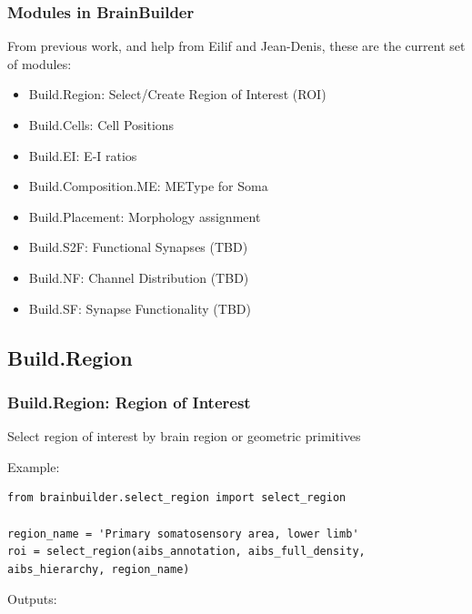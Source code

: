 \documentclass{beamer}
\begin{document}
\begin{frame}
  \frametitle{Modules in BrainBuilder}

  From previous work, and help from Eilif and Jean-Denis, these are the current set of modules:
  \begin{itemize}
     \item Build.Region: Select/Create Region of Interest (ROI)
     \item Build.Cells:  Cell Positions
     \item Build.EI:  E-I ratios
     \item Build.Composition.ME: METype for Soma
     \item Build.Placement: Morphology assignment
     \item Build.S2F: Functional Synapses (TBD)
     \item Build.NF: Channel Distribution (TBD)
     \item Build.SF: Synapse Functionality (TBD)
  \end{itemize}
\end{frame}

\subsection{Build.Region}
\begin{frame}[fragile]
  \frametitle{Build.Region: Region of Interest}

  Select region of interest by brain region or geometric primitives

  Example:
\begin{lstlisting}
from brainbuilder.select_region import select_region

region_name = 'Primary somatosensory area, lower limb'
roi = select_region(aibs_annotation, aibs_full_density, aibs_hierarchy, region_name)
\end{lstlisting}

  Outputs:
\end{frame}
\end{document}
